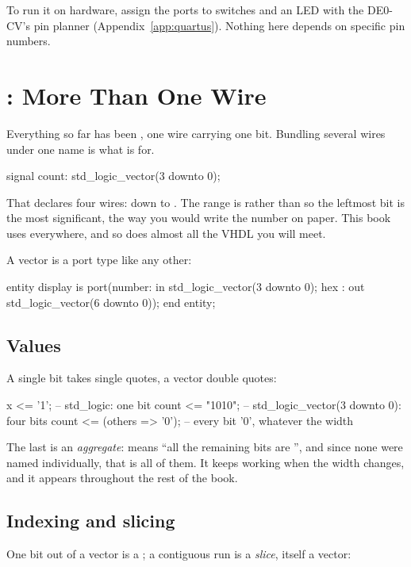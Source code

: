 
To run it on hardware, assign the ports to switches and an LED with the DE0-CV's pin planner
(Appendix~\ref{app:quartus}). Nothing here depends on specific pin numbers.

\section{: More Than One Wire}
\label{c2:a3}
Everything so far has been , one wire carrying one bit. Bundling several wires under
one name is what  is for.

\begin{vhdlcode}
signal count: std_logic_vector(3 downto 0);
\end{vhdlcode}

\noindent That declares four wires:  down to . The range is
 rather than  so the leftmost bit is the most significant, the way you
would write the number on paper. This book uses  everywhere, and so does almost all the
VHDL you will meet.

A vector is a port type like any other:

\begin{vhdlcode}
entity display is
    port(number: in  std_logic_vector(3 downto 0);
         hex   : out std_logic_vector(6 downto 0));
end entity;
\end{vhdlcode}

\subsection{Values}
\label{c2:values}
A single bit takes single quotes, a vector double quotes:

\begin{vhdlcode}
x     <= '1';                -- std_logic: one bit
count <= "1010";             -- std_logic_vector(3 downto 0): four bits
count <= (others => '0');    -- every bit '0', whatever the width
\end{vhdlcode}

\noindent The last is an \emph{aggregate}:  means ``all the remaining bits are
'', and since none were named individually, that is all of them. It keeps working when the
width changes, and it appears throughout the rest of the book.

\subsection{Indexing and slicing}
\label{c2:slicing}
One bit out of a vector is a ; a contiguous run is a \emph{slice}, itself a vector:

